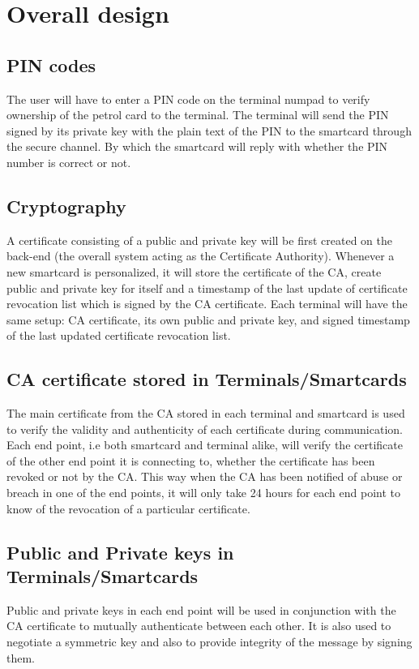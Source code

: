 \section{Overall design}
\subsection{PIN codes}
The user will have to enter a PIN code on the terminal numpad to verify ownership of the petrol card to the terminal. The terminal will send the PIN signed by its private key with the plain text of the PIN to the smartcard through the secure channel. By which the smartcard will reply with whether the PIN number is correct or not.

\subsection{Cryptography}
A certificate consisting of a public and private key will be first created on the back-end (the overall system acting as the Certificate Authority). Whenever a new smartcard is personalized, it will store the certificate of the CA, create public and private key for itself and a timestamp of the last update of certificate revocation list which is signed by the CA certificate. Each terminal will have the same setup: CA certificate, its own public and private key, and signed timestamp of the last updated certificate revocation list.

\subsection{CA certificate stored in Terminals/Smartcards}
The main certificate from the CA stored in each terminal and smartcard is used to verify the validity and authenticity of each certificate during communication. Each end point, i.e both smartcard and terminal alike, will verify the certificate of the other end point it is connecting to, whether the certificate has been revoked or not by the CA. This way when the CA has been notified of abuse or breach in one of the end points, it will only take 24 hours for each end point to know of the revocation of a particular certificate.

\subsection{Public and Private keys in Terminals/Smartcards}
Public and private keys in each end point will be used in conjunction with the CA certificate to mutually authenticate between each other. It is also used to negotiate a symmetric key and also to provide integrity of the message by signing them.

